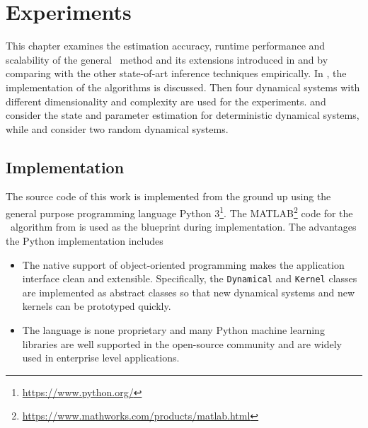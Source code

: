 \chapter{Experiments}
\label{ch-experiments}

This chapter examines the estimation accuracy, runtime performance and scalability of the general \algolpmf\ method and its extensions introduced in  and  by comparing with the other state-of-art inference techniques empirically.
In , the implementation of the algorithms is discussed.
Then four dynamical systems with different dimensionality and complexity are used for the experiments.
 and  consider the state and parameter estimation for deterministic dynamical systems, while  and  consider two random dynamical systems.

\section{Implementation}
\label{sec-implementation}

The source code of this work is implemented from the ground up using the general purpose programming language Python 3\footnote{\url{https://www.python.org/}}.
The MATLAB\footnote{\url{https://www.mathworks.com/products/matlab.html}} code for the \algovgmgp\ algorithm from \cite{gorbach2017scalable} is used as the blueprint during implementation.
The advantages the Python implementation includes
\begin{itemize}
    \item The native support of object-oriented programming makes the application interface clean and extensible. Specifically, the \texttt{Dynamical} and \texttt{Kernel} classes are implemented as abstract classes so that new dynamical systems and new kernels can be prototyped quickly.
    \item The language is none proprietary and many Python machine learning libraries are well supported in the open-source community and are widely used in enterprise level applications.
\end{itemize}

